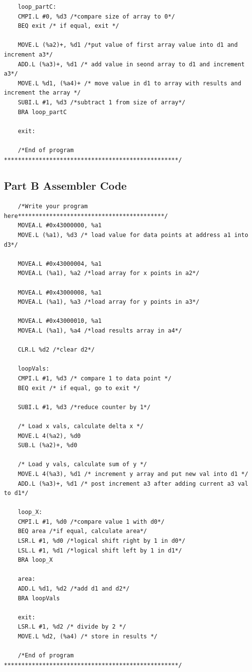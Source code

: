 \documentclass[10pt, letterpaper, titlepage]{article} %
\begin{document}
\begin{lstlisting}
	loop_partC:
	CMPI.L #0, %d3 /*compare size of array to 0*/
	BEQ exit /* if equal, exit */
	
	MOVE.L (%a2)+, %d1 /*put value of first array value into d1 and increment a3*/
	ADD.L (%a3)+, %d1 /* add value in seond array to d1 and increment a3*/
	MOVE.L %d1, (%a4)+ /* move value in d1 to array with results and increment the array */
	SUBI.L #1, %d3 /*subtract 1 from size of array*/
	BRA loop_partC
	
	exit:
	
	/*End of program **************************************************/
\end{lstlisting}

\subsection{Part B Assembler Code}
\begin{lstlisting}
	/*Write your program here******************************************/
	MOVEA.L #0x43000000, %a1 
	MOVE.L (%a1), %d3 /* load value for data points at address a1 into d3*/
	
	MOVEA.L #0x43000004, %a1
	MOVEA.L (%a1), %a2 /*load array for x points in a2*/
	
	MOVEA.L #0x43000008, %a1
	MOVEA.L (%a1), %a3 /*load array for y points in a3*/
	
	MOVEA.L #0x43000010, %a1
	MOVEA.L (%a1), %a4 /*load results array in a4*/
	
	CLR.L %d2 /*clear d2*/
	
	loopVals:
	CMPI.L #1, %d3 /* compare 1 to data point */
	BEQ exit /* if equal, go to exit */
	
	SUBI.L #1, %d3 /*reduce counter by 1*/
	
	/* Load x vals, calculate delta x */
	MOVE.L 4(%a2), %d0
	SUB.L (%a2)+, %d0
	
	/* Load y vals, calculate sum of y */
	MOVE.L 4(%a3), %d1 /* increment y array and put new val into d1 */ 
	ADD.L (%a3)+, %d1 /* post increment a3 after adding current a3 val to d1*/
	
	loop_X:
	CMPI.L #1, %d0 /*compare value 1 with d0*/
	BEQ area /*if equal, calculate area*/
	LSR.L #1, %d0 /*logical shift right by 1 in d0*/
	LSL.L #1, %d1 /*logical shift left by 1 in d1*/
	BRA loop_X
	
	area:
	ADD.L %d1, %d2 /*add d1 and d2*/
	BRA loopVals 
	
	exit:
	LSR.L #1, %d2 /* divide by 2 */
	MOVE.L %d2, (%a4) /* store in results */
	
	/*End of program **************************************************/
\end{lstlisting}
\end{document}
